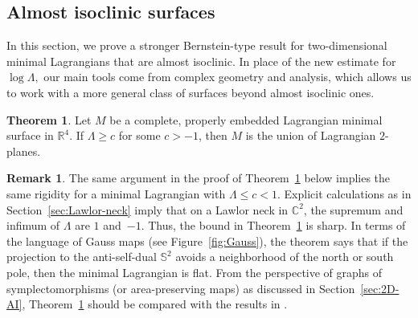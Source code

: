 \documentclass[11pt]{amsart}
\numberwithin{equation}{section}
\theoremstyle{definition}
\newtheorem{thm}[equation]{Theorem} %
\theoremstyle{definition}
\newtheorem{remark}[equation]{Remark}
\newcommand{\bb}[1]{\mathbb{#1}} \newcommand{\td}[1]{\widetilde{#1}}
\begin{document}
    




\subsection{Almost isoclinic surfaces}
\label{sec:surface-Bernstein}

In this section, we prove a stronger Bernstein-type result for two-dimensional minimal Lagrangians that are almost isoclinic.
In place of the new estimate for $\log\Lambda,$ our main tools come from complex geometry and analysis, which allows us to work with a more general class of surfaces beyond almost isoclinic ones.


\begin{thm}
	\label{thm:Bernstein}
	Let $M$ be a complete, properly embedded Lagrangian minimal surface in $\bb R^{4}.$
	If $\Lambda\ge c$ for some $c>-1$, then $M$ is the union of Lagrangian $2$-planes.
\end{thm}

\begin{remark}
\label{rmk:sharpness}
    The same argument in the proof of Theorem~\ref{thm:Bernstein} below implies the same rigidity for a minimal Lagrangian with $\Lambda\le c<1.$
    Explicit calculations as in Section~\ref{sec:Lawlor-neck} imply that on a Lawlor neck in $\bb C^2$, the supremum and infimum of $\Lambda$ are $1$ and~$-1.$
    Thus, the bound in Theorem~\ref{thm:Bernstein} is sharp.
    In terms of the language of Gauss maps (see Figure~\ref{fig:Gauss}), the theorem says that if the projection to the anti-self-dual $\mathbb S^2$ avoids a neighborhood of the north or south pole, then the minimal Lagrangian is flat.
    From the perspective of graphs of symplectomorphisms (or area-preserving maps) as discussed in Section~\ref{sec:2D-AI}, Theorem~\ref{thm:Bernstein} should be compared with the results in \cite{Ni}.
\end{remark}
\end{document}
